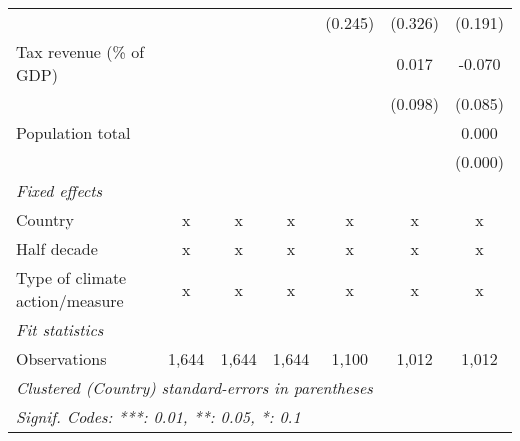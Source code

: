 \begin{tabular}{lcccccc}
                                                    &               &               &                & (0.245)       & (0.326)       & (0.191)\\   
   Tax revenue (\% of GDP)                          &               &               &                &               & 0.017         & -0.070\\   
                                                    &               &               &                &               & (0.098)       & (0.085)\\   
   Population total                                 &               &               &                &               &               & 0.000\\   
                                                    &               &               &                &               &               & (0.000)\\   
   \emph{Fixed effects}\\
   Country                                          & x             & x             & x              & x             & x             & x\\  
   Half decade                                      & x             & x             & x              & x             & x             & x\\  
   Type of climate action/measure                   & x             & x             & x              & x             & x             & x\\  
   \midrule \emph{Fit statistics}\\
   Observations                                     & 1,644         & 1,644         & 1,644          & 1,100         & 1,012         & 1,012\\  
   \midrule
   \multicolumn{7}{l}{\emph{Clustered (Country) standard-errors in parentheses}}\\
   \multicolumn{7}{l}{\emph{Signif. Codes: ***: 0.01, **: 0.05, *: 0.1}}\\
\end{tabular}
\par\endgroup


